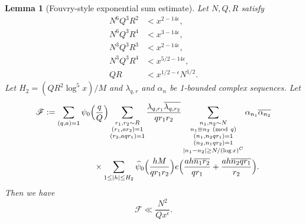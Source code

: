 \documentclass[10pt]{amsart}
\theoremstyle{plain}
\newtheorem{lmm}[thrm]{Lemma}
\numberwithin{equation}{section}
\newcommand{\Mod}[1]{\ (\mathrm{mod}\ #1)}
\renewcommand{\hat}[1]{\widehat #1}
\begin{document}
\begin{lmm}[Fouvry-style exponential sum estimate]\label{lmm:FouvryEstimate}
Let $N,Q,R$ satisfy
\begin{align}
N^6 Q^{3}R^2 &<x^{2-14\epsilon},\\
N^6 Q^3 R^4&<x^{3-14\epsilon},\\
N^{3}Q^{3}R^{3}&<x^{2-14\epsilon},\\
N^{3}Q^{3}R^{4}&<x^{5/2-14\epsilon},\\
Q R&<x^{1/2-\epsilon}N^{1/2}.
\end{align}
Let $H_2=(Q R^2\log^5{x})/M$ and $\lambda_{q,r}$ and $\alpha_n$ be 1-bounded complex sequences. Let
\begin{align*}
\mathscr{F}&:=\sum_{\substack{ (q,a)=1}}\psi_0\Bigl(\frac{q}{Q}\Bigr)\sum_{\substack{r_1,r_2\sim R\\ (r_1,a r_2)=1\\ (r_2,a q r_1)=1}}\frac{\lambda_{q,r_1}\overline{\lambda_{q,r_2}}}{q r_1 r_2}\sum_{\substack{n_1,n_2\sim N\\ n_1\equiv n_2\Mod{q}\\ (n_1,n_2qr_1)=1\\(n_2,n_1qr_2)=1\\ |n_1-n_2|\ge N/(\log{x})^C}}\alpha_{n_1}\overline{\alpha_{n_2}}\\
&\qquad\qquad\qquad\times\sum_{1\le |h|\le H_2}\hat{\psi}_0\Bigl(\frac{h M}{q r_1 r_2}\Bigr)e\Bigl(\frac{ah\overline{n_1 r_2}}{q r_1}+\frac{ah\overline{n_2 q r_1}}{r_2}\Bigr).
\end{align*}
Then we have
\[
\mathscr{F}\ll \frac{N^2}{Q x^\epsilon }.
\]
\end{lmm}
%
%
%
%
\end{document}
